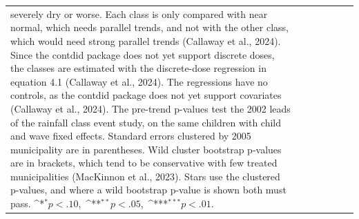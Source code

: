 \documentclass[12pt]{article}
\def\sym#1{\ifmmode^{#1}\else\(^{#1}\)\fi}
\begin{document}
\begin{longtable}{l*{6}{c}}
{severely dry or worse. Each class is only compared with near normal, which needs parallel trends, and not with the other class, which would need strong parallel trends (Callaway et al., 2024). Since the contdid package does not yet support discrete doses, the classes are estimated with the discrete-dose regression in equation 4.1 (Callaway et al., 2024). The regressions have no controls, as the contdid package does not yet support covariates (Callaway et al., 2024). The pre-trend p-values test the 2002 leads of the rainfall class event study, on the same children with child and wave fixed effects. Standard errors clustered by 2005 municipality are in parentheses.
Wild cluster bootstrap p-values are in brackets, which tend to be conservative with few treated municipalities (MacKinnon et al., 2023). Stars use the clustered p-values, and where a wild bootstrap p-value is shown both must pass. \mbox{\sym{*}\(p<.10\), \sym{**}\(p<.05\), \sym{***}\(p<.01\).}}\\
\end{longtable}
\endgroup
\clearpage
\begingroup
\footnotesize
\renewcommand{\arraystretch}{0.86}
\setlength{\tabcolsep}{4pt}
\setlength{\LTcapwidth}{\textwidth}
\end{document}
